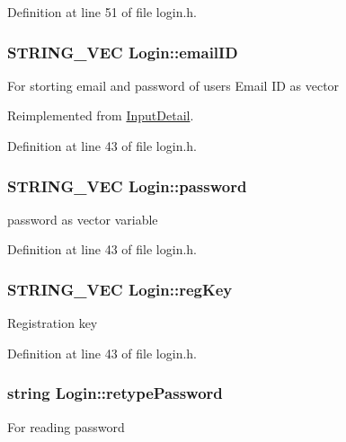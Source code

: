 \-Definition at line 51 of file login.\-h.

\hypertarget{classLogin_abea56d6d6403f1e627294f222dd77310}{
\subsubsection[{email\-I\-D}]{\setlength{\rightskip}{0pt plus 5cm}\-S\-T\-R\-I\-N\-G\-\_\-\-V\-E\-C {\bf \-Login\-::email\-I\-D}}}\label{dd/dfd/classLogin_abea56d6d6403f1e627294f222dd77310}
\-For storting email and password of users \-Email \-I\-D as vector 

\-Reimplemented from \hyperlink{classInputDetail_ad3f1db4fddbe0d4efbf1d5bc74d52257}{\-Input\-Detail}.



\-Definition at line 43 of file login.\-h.

\hypertarget{classLogin_a39f7fd03b2b27c927c657ee73e7fcbbc}{
\subsubsection[{password}]{\setlength{\rightskip}{0pt plus 5cm}\-S\-T\-R\-I\-N\-G\-\_\-\-V\-E\-C {\bf \-Login\-::password}}}\label{dd/dfd/classLogin_a39f7fd03b2b27c927c657ee73e7fcbbc}
password as vector variable 

\-Definition at line 43 of file login.\-h.

\hypertarget{classLogin_ae22f0ed73e5248cd71a7b2167676376a}{
\subsubsection[{reg\-Key}]{\setlength{\rightskip}{0pt plus 5cm}\-S\-T\-R\-I\-N\-G\-\_\-\-V\-E\-C {\bf \-Login\-::reg\-Key}}}\label{dd/dfd/classLogin_ae22f0ed73e5248cd71a7b2167676376a}
\-Registration key 

\-Definition at line 43 of file login.\-h.

\hypertarget{classLogin_ade36f8943aafce470ef4b8353c79b2c6}{
\subsubsection[{retype\-Password}]{\setlength{\rightskip}{0pt plus 5cm}string {\bf \-Login\-::retype\-Password}}}\label{dd/dfd/classLogin_ade36f8943aafce470ef4b8353c79b2c6}
\-For reading password 

